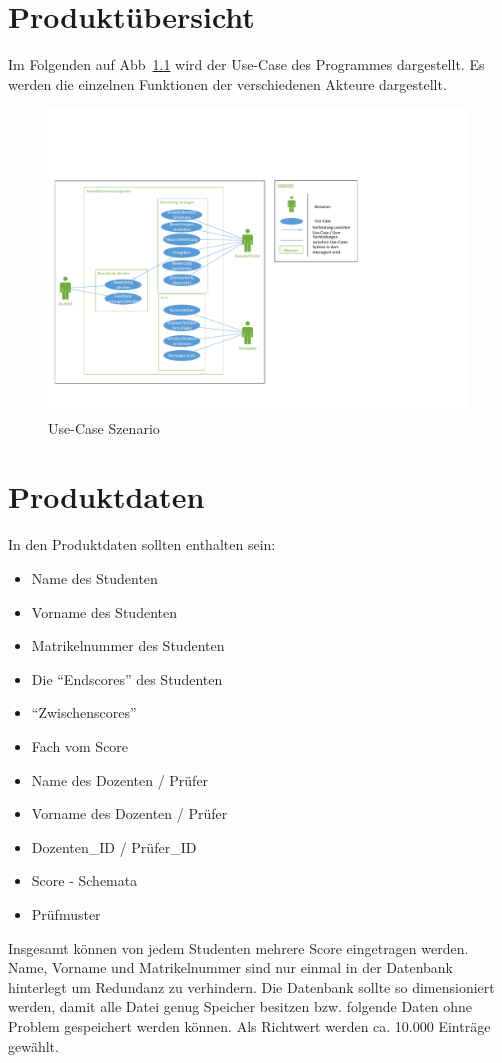\documentclass[a4paper,listof=leveldown,listof=numbered]{scrreprt}
\begin{document}
\chapter{Produktübersicht}
	Im Folgenden auf Abb~\ref{fig:usecase} wird der Use-Case des Programmes dargestellt. Es werden die einzelnen Funktionen der verschiedenen Akteure dargestellt.
	\begin{figure}[H]
		\centering
		\includegraphics[width=0.99\textwidth]{../Diagramme/Use_Case.pdf}
		\caption{Use-Case Szenario}
		\label{fig:usecase}
	\end{figure}
	
	
	
\chapter{Produktdaten}
	In den Produktdaten sollten enthalten sein:
	\begin{itemize}
		\item Name des Studenten
		\item Vorname des Studenten
		\item Matrikelnummer des Studenten
		\item Die "`Endscores"' des Studenten
		\item "`Zwischenscores"' 
		\item Fach vom Score 
		\item Name des Dozenten / Prüfer
		\item Vorname des Dozenten / Prüfer
		\item Dozenten\_ID / Prüfer\_ID
		\item Score - Schemata
		\item Prüfmuster

	\end{itemize}
	Insgesamt können von jedem Studenten mehrere Score eingetragen werden. Name, Vorname und Matrikelnummer sind nur einmal in der Datenbank hinterlegt um Redundanz zu verhindern. 
	Die Datenbank sollte so dimensioniert werden, damit alle Datei genug Speicher besitzen bzw. folgende Daten ohne Problem gespeichert werden können. Als Richtwert werden ca. 10.000 Einträge gewählt. 
	
\end{document}
